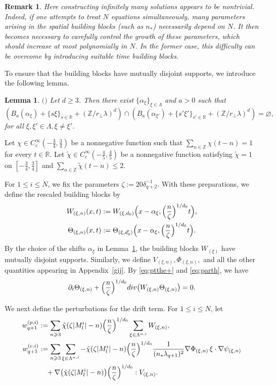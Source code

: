\documentclass[10pt,a4paper]{amsart}
\numberwithin{equation}{section}
\newtheorem{lemma}[theorem]{Lemma}
\newtheorem{remark}[theorem]{Remark}
\def\geq{\geqslant}
\def\leq{\leqslant}
\def\div{\mathord{{\rm div}}}
\def\bl{\begin{lemma}}
\def\el{\end{lemma}}
\def\br{\begin{remark}}
\def\er{\end{remark}}
\def\geq{\geqslant}
\def\leq{\leqslant}
\def\div{\mathord{{\rm div}}}
\begin{document}
\br
 Here constructing infinitely many   solutions appears to be   nontrivial. 
Indeed, if one attempts to treat $N$ equations simultaneously, many parameters arising in the spatial building blocks (such as $n_*$) necessarily depend on $N$. 
It then becomes necessary to carefully control the growth of these parameters, which should increase at most polynomially in $N$. In the former case, this difficulty can be overcome by introducing suitable time building blocks. 
\er
To ensure that the building blocks have mutually disjoint supports, we introduce the following lemma.
\bl\label{lem:4}
$($\cite[Lemma 3]{BMS}$)$
Let $d\geq3$. Then there exist $\{\alpha_\xi\}_{\xi\in\Lambda}$ and $a>0$ such that
$$(B_a(\alpha_\xi)+\{s\xi\}_{s\in \mathbb{R}}+(\mathbb{Z}/r_\perp\lambda)^d)\cap
(B_a(\alpha_{\xi'})+\{s'\xi'\}_{s'\in \mathbb{R}}+(\mathbb{Z}/r_\perp\lambda)^d)=\varnothing,$$
for all $\xi,\xi'\in\Lambda ,\xi\neq\xi'$.
\el 


Let
$
\chi\in C_c^\infty(-\frac34,\frac34)
$
be a nonnegative function such that
$
\sum_{n\in\mathbb{Z}}\chi(t-n)=1
$
for every $t\in\mathbb{R}$.
Let
$
\tilde{\chi}\in C_c^\infty(-\frac45,\frac45)
$
be a nonnegative function satisfying
$
\tilde{\chi}=1
$
on
$
[-\frac34,\frac34]
$
and
$
\sum_{n\in\mathbb{Z}}\tilde{\chi}(t-n)\leq2.
$

For $1\leq i\leq N$, we fix the parameters
$
\zeta:=20\delta_{q+2}^{-1}.
$ 
With these preparations, we define the rescaled building blocks by
\begin{align*}
W_{(\xi,n)}(x,t)
&:=
W_{(\xi,d_0)}
\Bigl(
x-\alpha_\xi,
\Bigl(\frac{n}{\zeta}\Bigr)^{1/d_0}
t
\Bigr),
\\
\Theta_{(\xi,n)}(x,t)
&:=
\Theta_{(\xi,d_0')}
\Bigl(
x-\alpha_\xi,
\Bigl(\frac{n}{\zeta}\Bigr)^{1/d_0}
t
\Bigr).
\end{align*}
By the choice of the shifts $\alpha_\xi$ in Lemma~\ref{lem:4}, the building blocks $W_{(\xi)}$ have mutually disjoint supports.
Similarly, we define
$
V_{(\xi,n)},
\Phi_{(\xi,n)},
$
and all the other quantities appearing in Appendix~\ref{gij}. 
By \eqref{eq:ptthe+} and \eqref{eq:parth}, we have
\begin{align}
\partial_t\Theta_{(\xi,n)}
+
\Bigl(\frac{n}{\zeta}\Bigr)^{1/d_0}
\div\bigl(
W_{(\xi,n)}\Theta_{(\xi,n)}
\bigr)
=
0. \notag
\end{align}

We next define the perturbations for the drift term. 
For $1\leq i\leq N$, let
\begin{align*}
w_{q+1}^{(p,i)}
&:=
\sum_{n\geq3}
\tilde{\chi}(\zeta|M_l^i|-n)
\Bigl(\frac{n}{\zeta}\Bigr)^{1/d_0}
\sum_{\xi\in\Lambda^{n,i}}
W_{(\xi,n)},\notag\\
w_{q+1}^{(c,i)}
&:=
\sum_{n\geq3}
\sum_{\xi\in\Lambda^{n,i}}
-\tilde{\chi}(\zeta|M_l^i|-n)
\Bigl(\frac{n}{\zeta}\Bigr)^{1/d_0}
\frac1{(n_*\lambda_{q+1})^2}
\nabla\Phi_{(\xi,n)}
\,\xi\cdot\nabla\psi_{(\xi,n)}
\\
&\quad
+
\nabla\bigl(
\tilde{\chi}(\zeta|M_l^i|-n)
\bigr)
\Bigl(\frac{n}{\zeta}\Bigr)^{1/d_0}
:V_{(\xi,n)}
.
\end{align*}
\end{document}
